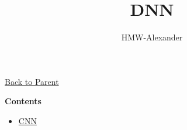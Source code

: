 \documentclass[letterpaper,11pt]{article}
\title{\textbf{DNN}}
\author{HMW-Alexander}
\begin{document}
\maketitle

\href{../index.html}{Back to Parent}

\textbf{Contents}
\begin{itemize}
	\item \href{./CNN/index.html}{CNN}
\end{itemize}
	
\end{document}
